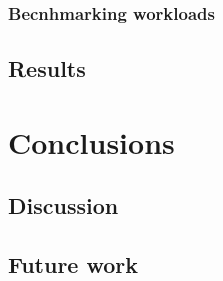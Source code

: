 \documentclass[english, 12pt, a4paper, elec, utf8, a-2b, online]{aaltothesis}
\begin{document}
\subsubsection{Becnhmarking workloads}

\subsection{Results}
\clearpage
\section{Conclusions}
\label{sec:conclusion}
\label{sec:summary}

\subsection{Discussion}

\subsection{Future work}

\clearpage
\printbibliography[heading=bibintoc] %
\end{document}
